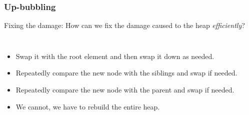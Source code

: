 \begin{frame}
	\frametitle{Up-bubbling}

Fixing the damage:	How can we fix the damage caused to the heap \textit{efficiently}?
		\begin{columns}[T]
			
			\begin{itemize}
				\item Swap it with the root element and then swap it down as needed.
				\item Repeatedly compare the new node with the siblings and swap if needed.
				\item Repeatedly compare the new node with the parent and swap if needed.
				\item We cannot, we have to rebuild the entire heap.
			\end{itemize}
		\end{columns}
\end{frame}


				

